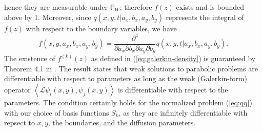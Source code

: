 \documentclass[10pt]{article}
\begin{document}
hence they are measurable under $\mathbb{P}_{W}$; therefore $f(z)$ exists and
is bounded above by 1. Moreover, since $q(x,y,t|a_x,b_x,a_y,b_y)$ represents the
integral of $f(z)$ with respect to the boundary variables, we have
\[
  f(x,y,a_x,b_x,a_y,b_y) = \frac{\partial^4}{\partial a_x \partial b_x \partial a_y \partial
         b_y} q(x,y,t | a_x, b_x, a_y, b_y).
\]
The existence of $f^{(k)}(z)$ as defined in
(\ref{eq:galerkin-density}) is guaranteed by Theorem 4.1 in
\cite{singler2008differentiability}. The result states that weak
solutions to parabolic problems are differentiable with respect to
parameters as long as the weak (Galerkin-form) operator
$\left< \mathcal{L} \psi_i(x,y), \psi_j(x,y) \right>$ is
differentiable with respect to the parameters. The condition certainly
holds for the normalized problem (\ref{eq:qq}) with our choice of
basis functions $S_k$, as they are infinitely differentiable with
repsect to $x,y$, the boundaries, and the diffusion parameters. 
\end{document}
